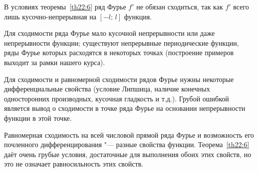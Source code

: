 \begin{notion}[Замечание 1]
В условиях теоремы~\ref{th22:6} ряд Фурье $f'$ не обязан сходиться, так как $f'$ всего лишь кусочно-непрерывная на $[-l;\, l]$ функция.

Для сходимости ряда Фурье мало кусочной непрерывности или даже непрерывности функции; существуют непрерывные периодические функции, ряды Фурье которых расходятся в некоторых точках (построение примеров выходит за рамки нашего курса).

Для сходимости и равномерной сходимости рядов Фурье нужны некоторые дифференциальные свойства (условие Липшица, наличие конечных односторонних производных, кусочная гладкость и т.д.). Грубой ошибкой является вывод о сходимости в точке ряда Фурье на основании непрерывности функции в этой точке.
\end{notion}

\begin{notion}[Замечание 2]
Равномерная сходимость на всей числовой прямой ряда Фурье и возможность его почленного дифференцирования "--- разные свойства функции. Теорема~\ref{th22:6} даёт очень грубые условия, достаточные для выполнения обоих этих свойств, но это не означает равносильность этих свойств.
\end{notion}